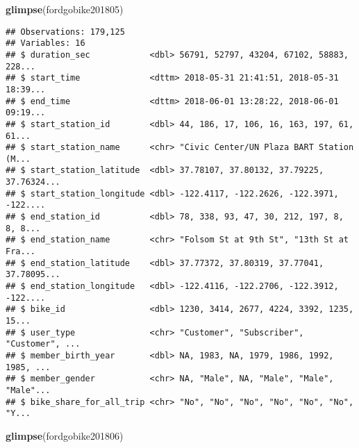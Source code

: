 \documentclass[]{article}
\newenvironment{Shaded}{\begin{snugshade}}{\end{snugshade}}
\newcommand{\KeywordTok}[1]{\textcolor[rgb]{0.13,0.29,0.53}{\textbf{#1}}}
\newcommand{\NormalTok}[1]{#1}
\begin{document}
\begin{Shaded}
\begin{Highlighting}[]
\KeywordTok{glimpse}\NormalTok{(fordgobike201805)}
\end{Highlighting}
\end{Shaded}

\begin{verbatim}
## Observations: 179,125
## Variables: 16
## $ duration_sec            <dbl> 56791, 52797, 43204, 67102, 58883, 228...
## $ start_time              <dttm> 2018-05-31 21:41:51, 2018-05-31 18:39...
## $ end_time                <dttm> 2018-06-01 13:28:22, 2018-06-01 09:19...
## $ start_station_id        <dbl> 44, 186, 17, 106, 16, 163, 197, 61, 61...
## $ start_station_name      <chr> "Civic Center/UN Plaza BART Station (M...
## $ start_station_latitude  <dbl> 37.78107, 37.80132, 37.79225, 37.76324...
## $ start_station_longitude <dbl> -122.4117, -122.2626, -122.3971, -122....
## $ end_station_id          <dbl> 78, 338, 93, 47, 30, 212, 197, 8, 8, 8...
## $ end_station_name        <chr> "Folsom St at 9th St", "13th St at Fra...
## $ end_station_latitude    <dbl> 37.77372, 37.80319, 37.77041, 37.78095...
## $ end_station_longitude   <dbl> -122.4116, -122.2706, -122.3912, -122....
## $ bike_id                 <dbl> 1230, 3414, 2677, 4224, 3392, 1235, 15...
## $ user_type               <chr> "Customer", "Subscriber", "Customer", ...
## $ member_birth_year       <dbl> NA, 1983, NA, 1979, 1986, 1992, 1985, ...
## $ member_gender           <chr> NA, "Male", NA, "Male", "Male", "Male"...
## $ bike_share_for_all_trip <chr> "No", "No", "No", "No", "No", "No", "Y...
\end{verbatim}

\begin{Shaded}
\begin{Highlighting}[]
\KeywordTok{glimpse}\NormalTok{(fordgobike201806)}
\end{Highlighting}
\end{Shaded}
\end{document}
